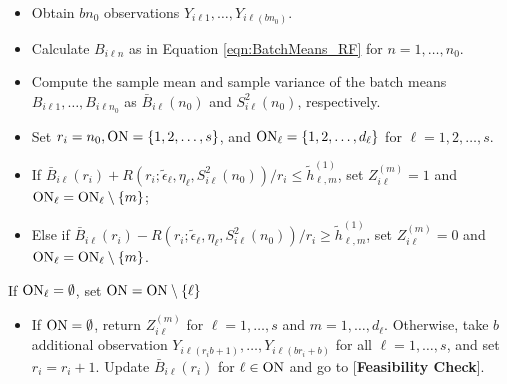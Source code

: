 \documentclass[11pt]{article}
\begin{document}
\begin{algorithm}[h!]
{\begin{algorithmic}
        
        \State [{\bf Initialization}:] 
            \setlength{\itemindent}{0.26in}
            \begin{itemize}
            \item Obtain $b n_0$ observations $Y_{i\ell1}, \ldots, Y_{i\ell (b n_0)}$.
            \item Calculate
            $B_{i \ell n}$ as in Equation \eqref{eqn:BatchMeans_RF} for $n=1,\ldots,n_0$. 
            \item Compute the sample mean and sample variance of the batch means $B_{i\ell 1}, \ldots, B_{i\ell n_0}$ as $\bar{B}_{i \ell}(n_0)$ and $S_{i \ell}^2\left(n_0\right)$, respectively.  
            \item Set $r_{i}=n_0, {\rm ON} = \{1,2,\ldots, s\}$, and ${\rm ON}_\ell = \{1,2,\ldots, d_\ell\}$ for $\ell = 1, 2, \ldots, s$.
            \end{itemize}
		\begin{itemize}
			\setlength{\itemindent}{0.3in}
            \item[] If $\bar{B}_{i \ell}\left(r_i\right)+R(r_i ; \tilde{\epsilon}_{\ell}, \eta_\ell, S_{i \ell}^2\left(n_0\right))/{r_i} \leq \tilde{h}_{\ell,m}^{(1)}$, set $ Z_{i\ell}^{(m)}=1$ and ${\rm ON}_\ell = {\rm ON}_\ell \setminus \{m\}$;
			\item[] Else if $\bar{B}_{i \ell}\left(r_i\right)-R(r_i ; \tilde{\epsilon}_{\ell}, \eta_\ell, S_{i \ell}^2\left(n_0\right))/{r_i} \geq \tilde{h}_{\ell,m}^{(1)}$, set $ Z_{i\ell}^{(m)}=0$ and ${\rm ON}_\ell = {\rm ON}_\ell \setminus \{m\}$. 
		\end{itemize}
        \EndFor
        \State If ${\rm ON}_\ell = \emptyset$, set ${\rm ON} = {\rm ON}\setminus \{\ell\}$
        \EndFor
		 \begin{itemize}
			\item[] If ${\rm ON}=\emptyset$, return $Z_{i\ell}^{(m)}$ for $\ell=1,\ldots,s$ and $m=1,\ldots,d_\ell$. Otherwise, take $b$ additional observation $Y_{i\ell (r_{i}b+1)}, \ldots, Y_{i \ell (b r_i+b)}$ for all $\ell=1,\ldots,s$, and set $r_{i}=r_{i}+1$. Update $\bar{B}_{i \ell}\left(r_i\right)$ for $\ell \in {\rm ON}$ and go to [{\bf Feasibility Check}].
		\end{itemize} 
    \EndFor


\end{algorithmic}
}
\end{algorithm}
\end{document}
